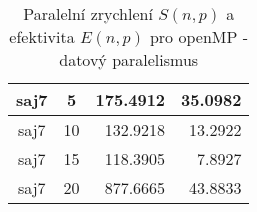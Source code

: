 \documentclass{article} \oddsidemargin=-5mm
\begin{document}
\begin{table}[h]
\begin{tabular}{|c|c|r|r|}
saj7              & 5                  & 175.4912                                                     & 35.0982                                                      \\ \hline
saj7              & 10                 & 132.9218                                                     & 13.2922                                                      \\ \hline
saj7              & 15                 & 118.3905                                                     & 7.8927                                                       \\ \hline
saj7              & 20                 & 877.6665                                                     & 43.8833                                                      \\ \hline
\end{tabular}
\caption{Paralelní zrychlení $S(n,p)$ a efektivita $E(n,p)$ pro openMP - datový paralelismus}
\label{openMP-dat-efectivity}
\end{table}
\end{document}

